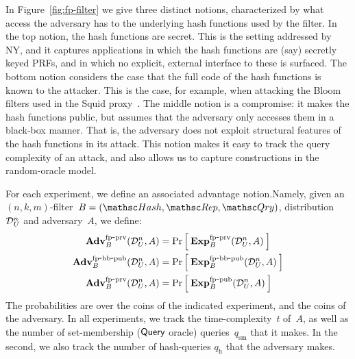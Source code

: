 In Figure~\ref{fig:fp-filter} we give three distinct notions,
characterized by what access the adversary has to the underlying
hash functions used by the filter.  In the top notion, the hash
functions are secret.  This is the setting addressed by NY, and it
captures applications in which the hash functions are (say) secretly
keyed PRFs, and in which no explicit, external interface to these is
surfaced.
%
The bottom notion considers the case that the full code of the hash functions is known to the attacker.  This is the case, for example, when attacking the Bloom filters used in the Squid proxy~\cite{xxx}.
%
The middle notion is a compromise: it makes the hash functions
public, but assumes that the adversary only accesses them in a
black-box manner.  That is, the adversary does not exploit
structural features of the hash functions in its attack.  This
notion makes it easy to track the query complexity of an attack, and
also allows us to capture constructions in the random-oracle model.

For each experiment, we define an associated advantage
notion.Namely, given an $(n,k,m)$-filter~$B=(\Hash,\Rep,\Qry)$,
distribution~$\mathcal{D}_{U}^{n}$ and adversary~$A$, we define:
\begin{align*}
\mathrm{\mathbf{Adv}}^{\mathrm{fp\mbox{-}prv}}_{B}(\mathcal{D}_{U}^{n},A) &= \Pr\left[\: \mathrm{\mathbf{Exp}}^{\mathrm{fp\mbox{-}prv}}_{B}(\mathcal{D}_{U}^{n},A) \:\right] \\
\mathrm{\mathbf{Adv}}^{\mathrm{fp\mbox{-}bb\mbox{-}pub}}_{B}(\mathcal{D}_{U}^{n},A) &= \Pr\left[\: \mathrm{\mathbf{Exp}}^{\mathrm{fp\mbox{-}bb\mbox{-}pub}}_{B}(\mathcal{D}_{U}^{n},A) \:\right] \\
\mathrm{\mathbf{Adv}}^{\mathrm{fp\mbox{-}prv}}_{B}(\mathcal{D}_{U}^{n},A) &= \Pr\left[\: \mathrm{\mathbf{Exp}}^{\mathrm{fp\mbox{-}pub}}_{B}(\mathcal{D}_{U}^{n},A) \:\right]
\end{align*}
The probabilities are over the coins of the indicated experiment,
and the coins of the adversary.   In all experiments, we track the
time-complexity~$t$ of~$A$, as well as the number of set-membership
($\mathsf{Query}$ oracle) queries~$q_{\mathrm{sm}}$ that it makes.   In
the second, we also track the number of hash-queries
$q_{\mathrm{h}}$ that the adversary makes.



